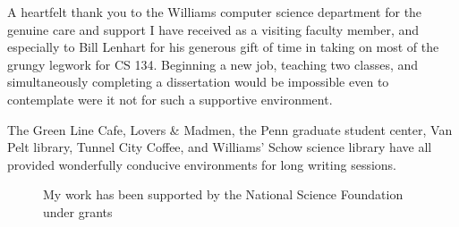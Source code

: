 A heartfelt thank you to the Williams computer science department for
the genuine care and support I have received as a visiting faculty
member, and especially to Bill Lenhart for his generous gift of time
in taking on most of the grungy legwork for CS 134.  Beginning a new
job, teaching two classes, and simultaneously completing a
dissertation would be impossible even to contemplate were it not for
such a supportive environment.

The Green Line Cafe, Lovers \& Madmen, the Penn graduate student
center, Van Pelt library, Tunnel City Coffee, and Williams' Schow
science library have all provided wonderfully conducive environments
for long writing sessions.


\begin{figure}[b]
\tiny\flushleft

My work has been supported by the National Science Foundation under
grants 
\end{figure}
